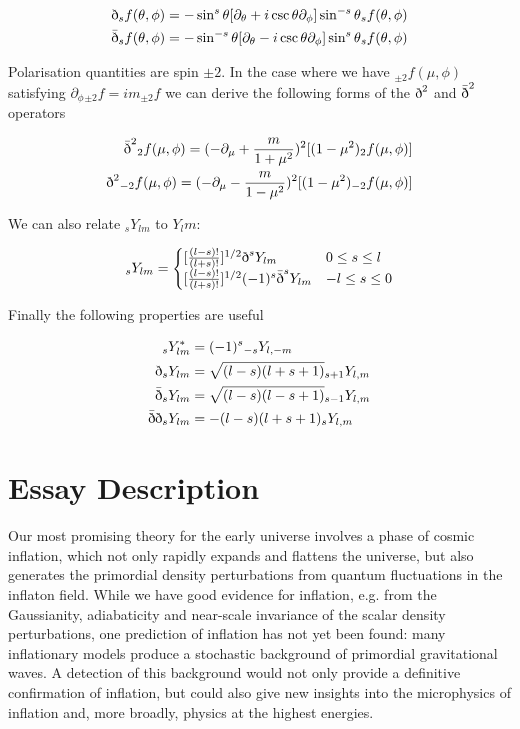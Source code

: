 \documentclass[a4paper,11pt]{article}
\newcommand{\sr}{\text{\normalfont\dh}}
\renewcommand{\sl}{\bar{\text{\normalfont\dh}}}
\begin{document}
\begin{align}
\sr {}_sf(\theta, \phi) &= -\sin^s{\theta}[\partial_\theta+i\csc{\theta}\partial_\phi]\sin^{-s}{\theta}{}_sf(\theta, \phi)\\
\sl {}_sf(\theta, \phi) &= -\sin^{-s}{\theta}[\partial_\theta-i\csc{\theta}\partial_\phi]\sin^{s}{\theta}{}_sf(\theta, \phi)
\end{align}

Polarisation quantities are spin $\pm 2$. In the case where we have ${}_{\pm2}f(\mu,\phi)$ satisfying $\partial_\phi{}_{\pm2}f=im_{\pm2}f$ we can derive the following forms of the $\sr^2$ and $\sl^2$ operators

\begin{align}
\sl^2{}_2f(\mu, \phi) = (-\partial_\mu+\frac{m}{1+\mu^2})^2[(1-\mu^2)_2f(\mu,\phi)]\\
\sr^2{}_{-2}f(\mu, \phi) = (-\partial_\mu-\frac{m}{1-\mu^2})^2[(1-\mu^2)_{-2}f(\mu,\phi)]
\label{+-2}
\end{align}


We can also relate $_sY_{lm}$ to $Y_lm$:

\begin{equation}
_sY_{lm} = 
\begin{cases}
[\frac{(l-s)!}{(l+s)!}]^{1/2}\sr^s Y_{lm} & 0\leq s\leq l\\
[\frac{(l-s)!}{(l+s)!}]^{1/2}(-1)^s\sl^s Y_{lm} & -l\leq s\leq 0
\end{cases}
\end{equation}


Finally the following properties are useful

\begin{align}
{}_sY_{lm}^* &= (-1)^s {}_{-s}Y_{l,-m}\\
\sr {}_sY_{lm} &= \sqrt{(l-s)(l+s+1)}{}_{s+1}Y_{l,m}\\
\sl {}_sY_{lm} &= \sqrt{(l-s)(l-s+1)}{}_{s-1}Y_{l,m}\\
\sl\sr {}_sY_{lm} &= -(l-s)(l+s+1){}_{s}Y_{l,m}
\label{propertiesofspin}
\end{align}

\section{Essay Description}
Our most promising theory for the early universe involves a phase of cosmic inflation, which not only rapidly expands and flattens the universe, but also generates the primordial density perturbations from quantum fluctuations in the inflaton field. While we have good evidence for inflation, e.g. from the Gaussianity, adiabaticity and near-scale invariance of the scalar density perturbations, one prediction of inflation has not yet been found: many inflationary models produce a stochastic background of primordial gravitational waves. A detection of this background would not only provide a definitive confirmation of inflation, but could also give new insights into the microphysics of inflation and, more broadly, physics at the highest energies.\\
\end{document}
